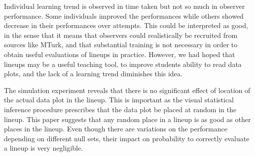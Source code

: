 \documentclass[10pt]{article}\usepackage[]{graphicx}\usepackage[]{color}
\begin{document}

Individual learning trend is observed in time taken but not so much in observer performance. Some individuals improved the performances while others showed decrease in their performances over attempts. This could be interpreted as good, in the sense that it means that observers could realistically be recruited from sources like MTurk, and that substantial training is not necessary in order to obtain useful evaluations of lineups in practice. However, we had hoped that lineups may be a useful teaching tool, to improve students ability to read data plots, and the lack of a learning trend diminishes this idea. 


The simulation experiment reveals that there is no significant effect of location of the actual data plot in the lineup. This is important as the visual statistical inference procedure prescribes that the data plot be placed at random in the lineup. This paper suggests that any random place in a lineup is as good as other places in the lineup. Even though there are variations on the performance depending on different null sets, their impact on probability to correctly evaluate a lineup is very negligible. 
\end{document}
